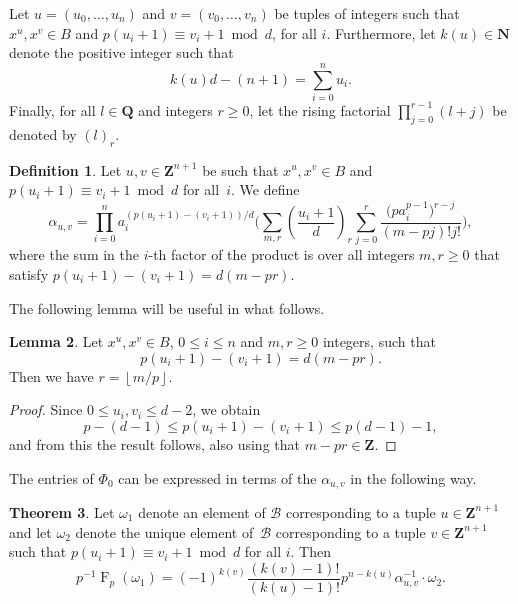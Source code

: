 \documentclass[a4paper,11pt]{article}
\numberwithin{equation}{section}
\providecommand{\floor}[1]{\left\lfloor#1\right\rfloor}   %
\newcommand{\NN}{\mathbf{N}} %
\newcommand{\ZZ}{\mathbf{Z}} %
\newcommand{\QQ}{\mathbf{Q}} %
\DeclareMathOperator{\Frob}{F}           %
\providecommand{\cB}{\mathcal{B}} %
\theoremstyle{definition}
\newtheorem{thm}{Theorem}[section]
\newtheorem{lem}[thm]{Lemma}
\newtheorem{defn}[thm]{Definition}
\begin{document}
Let $u = (u_0, \dotsc, u_n)$ and $v = (v_0, \dotsc, v_n)$ be tuples 
of integers such that $x^u, x^v \in B$ and $p (u_i+1) \equiv v_i+1 \bmod{d}$,
for all $i$. Furthermore, let $k(u) \in \NN$ denote the positive integer such that 
\[
k(u) d -(n+1) = \sum_{i=0}^n u_i.
\] 
Finally, for all $l \in \QQ$ and integers $r \geq 0$, let the rising factorial $\prod_{j=0}^{r-1} (l + j)$ be
denoted by $(l)_r$.

\begin{defn} \label{defn:alpha}
Let $u, v \in \ZZ^{n+1}$ be such that 
$x^u, x^v \in B$ and 
$p (u_i + 1) \equiv v_i + 1 \bmod{d}$ for all~$i$. 
We define
\begin{equation*}
\alpha_{u,v} = \prod_{i=0}^n a_i^{(p (u_i + 1) - (v_i + 1))/d} 
    \biggl( \sum_{m,r} \left( \frac{u_i+1}{d} \right)_r 
        \sum_{j=0}^{r} \frac{\bigl(p a_i^{p-1}\bigr)^{r-j}}{(m-pj)!j!} \biggr),
\end{equation*}
where the sum in the $i$-th factor of the product is over all integers $m, r \geq 0$  
that satisfy $p(u_i+1)-(v_i+1)=d(m-pr)$.
\end{defn}

The following lemma will be useful in what follows.

\begin{lem} \label{lem:mpr}
Let $x^u, x^v \in B$, $0 \leq i \leq n$ and $m, r \geq 0$ integers, such that 
\[
p(u_i + 1) - (v_i + 1) = d(m-pr).
\] 
Then we have $r = \floor{m/p}$.
\end{lem}

\begin{proof}
Since $0 \leq u_i, v_i \leq d-2$, we obtain
\[
p-(d-1) \leq p(u_i + 1) - (v_i + 1) \leq p(d-1)-1,
\]
and from this the result follows, also using that $m - pr \in \ZZ$.
\end{proof}

The entries of $\Phi_0$ can be expressed in terms of the $\alpha_{u,v}$ in the following way.

\begin{thm} \label{thm:01-03-diagfrob}
Let $\omega_1$ denote an element of $\cB$ corresponding to a tuple 
$u \in \ZZ^{n+1}$ and let $\omega_2$ denote the unique element of~$\cB$ 
corresponding to a tuple $v \in \ZZ^{n+1}$ such that
$p (u_i + 1) \equiv v_i + 1 \bmod{d}$ for all $i$. Then
\begin{equation} \label{eq:diagfrobformula}
p^{-1} \Frob_p (\omega_1) = 
    (-1)^{k(v)} \frac{(k(v) - 1)!}{(k(u) - 1)!} p^{n-k(u)} \alpha_{u,v}^{-1} \cdot \omega_2.
\end{equation}
\end{thm}
\end{document}
